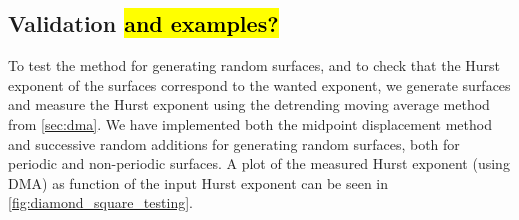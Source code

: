 \subsection[Validation and examples]{Validation \hl{and examples?}}
%
%
To test the method for generating random surfaces, and to check that the Hurst exponent of the surfaces correspond to the wanted exponent, we generate surfaces and measure the Hurst exponent using the detrending moving average method from \cref{sec:dma}. We have implemented both the midpoint displacement method and successive random additions for generating random surfaces, both for periodic and non-periodic surfaces. A plot of the measured Hurst exponent (using DMA) as function of the input Hurst exponent can be seen in \cref{fig:diamond_square_testing}.%
%
